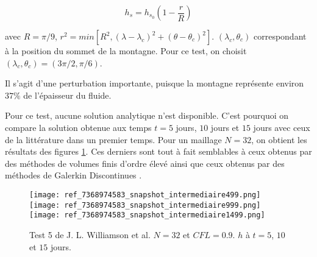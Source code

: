 \begin{equation}
h_s = h_{s_0} \left( 1 - \dfrac{r}{R} \right)
\end{equation}

avec $R= \pi / 9$, $r^2 = min \left[ R^2, \left( \lambda - \lambda_c \right)^2 + \left( \theta - \theta_c \right)^2 \right]$. $(\lambda_c, \theta_c)$ correspondant à la position du sommet de la montagne. Pour ce test, on choisit $(\lambda_c, \theta_c) = (3 \pi / 2, \pi / 6)$.

Il s'agit d'une perturbation importante, puisque la montagne représente environ $37 \%$ de l'épaisseur du fluide.

Pour ce test, aucune solution analytique n'est disponible. C'est pourquoi on compare la solution obtenue aux temps $t=5$ jours, $10$ jours et $15$ jours avec ceux de la littérature dans un premier temps. Pour un maillage $N=32$, on obtient les résultats des figures \ref{fig: williamson 5 space height}. Ces derniers sont tout à fait semblables à ceux obtenus par des méthodes de volumes finis \cite{Katta2015, Chen2008} d'ordre élevé ainsi que ceux obtenus par des méthodes de Galerkin Discontinues \cite{Nair2005}. 

\begin{figure}[ht]
\begin{center}
\texttt{[image: ref\_7368974583\_snapshot\_intermediaire499.png]}\\
\texttt{[image: ref\_7368974583\_snapshot\_intermediaire999.png]}\\
\texttt{[image: ref\_7368974583\_snapshot\_intermediaire1499.png]}
\end{center}
\caption{Test 5 de J. L. Williamson et al. \cite{Williamson1992} $N=32$ et $CFL=0.9$. $h$ à $t=5$, $10$ et $15$ jours.}
\label{fig: williamson 5 space height}
\end{figure}
